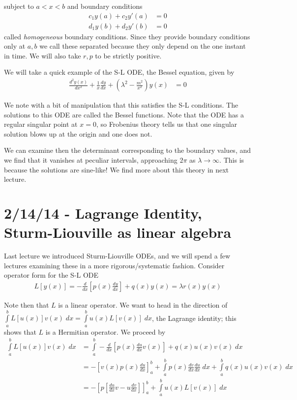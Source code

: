 \documentclass[10pt]{report}
\newcommand{\rtd}[2]{\frac{d^2#1}{d#2^2}}
\newcommand{\rd}[2]{\frac{d#1}{d#2}}
\begin{document}
subject to $a < x < b$ and boundary conditions 
\begin{align}
    c_1y(a) + c_2y'(a) &= 0\\
    d_1y(b) + d_2y'(b) &= 0
\end{align}
called \emph{homogeneous} boundary conditions. Since they provide boundary conditions only at $a,b$ we call these separated because they only depend on the one instant in time. We will also take $r,p$ to be strictly positive. 

We will take a quick example of the S-L ODE, the Bessel equation, given by
\begin{align}
    \rtd{y(x)}{x} + \frac{1}{x}\rd{y}{x} + \left( \lambda^2 - \frac{m^2}{x^2} \right)y(x) &= 0
\end{align}

We note with a bit of manipulation that this satisfies the S-L conditions. The solutions to this ODE are called the Bessel functions. Note that the ODE has a regular singular point at $x=0$, so Frobenius theory tells us that one singular solution blows up at the origin and one does not.

We can examine then the determinant corresponding to the boundary values, and we find that it vanishes at peculiar intervals, approaching $2\pi$ as $\lambda \to \infty$. This is because the solutions are sine-like! We find more about this theory in next lecture.

\chapter{2/14/14 - Lagrange Identity, Sturm-Liouville as linear algebra}

Last lecture we introduced Sturm-Liouville ODEs, and we will spend a few lectures examining these in a more rigorous/systematic fashion. Consider operator form for the S-L ODE
\begin{align}
    L[y(x)] = -\rd{}{x}\left[ p(x)\rd{y}{x} \right] + q(x) y(x) = \lambda r(x) y(x)
\end{align}

Note then that $L$ is a linear operator. We want to head in the direction of $\displaystyle\int\limits_{a}^{b}L[u(x)]v(x)\;dx = \displaystyle\int\limits_{a}^{b}u(x)L[v(x)]\;dx$, the Lagrange identity; this shows that $L$ is a Hermitian operator. We proceed by
\begin{align}
    \displaystyle\int\limits_{a}^{b}L[u(x)]v(x)\;dx &= \displaystyle\int\limits_{a}^{b}-\rd{}{x}\left[p(x)\rd{u}{x}v(x)\right] + q(x) u(x) v(x)\;dx\\
    &= -\left[v(x)p(x)\rd{u}{x}\right]_a^b + \displaystyle\int\limits_{a}^{b}p(x)\rd{v}{x}\rd{u}{x}\;dx + \displaystyle\int\limits_{a}^{b}q(x)u(x)v(x)\;dx\\
    &= -\left[ p\left[ \rd{u}{x}v - u\rd{v}{x} \right] \right]_a^b + \displaystyle\int\limits_{a}^{b}u(x)L[v(x)]\;dx
\end{align}
\end{document}
